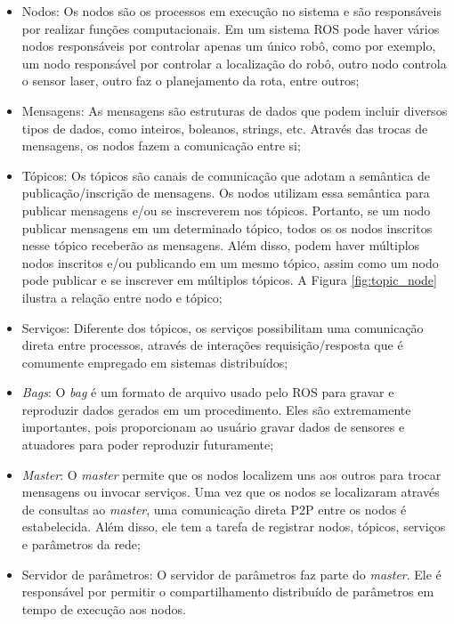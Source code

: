 \begin{itemize}
    \addtolength{\itemindent}{2em}
    \setlength\itemsep{1em}
    
    \item Nodos: Os nodos são os processos em execução no sistema e são responsáveis por realizar funções computacionais.  Em um sistema ROS pode haver vários nodos responsáveis por controlar apenas um único robô, como por exemplo, um nodo responsável por controlar a localização do robô, outro nodo controla o sensor laser, outro faz o planejamento da rota, entre outros;
    
    \item Mensagens: As mensagens são estruturas de dados que podem incluir diversos tipos de dados, como inteiros, boleanos, strings, etc. Através das trocas de mensagens, os nodos fazem a comunicação entre si;
    
    \item Tópicos: Os tópicos são canais de comunicação que adotam a semântica de publicação/inscrição de mensagens. Os nodos utilizam essa semântica para publicar mensagens e/ou se inscreverem nos tópicos. Portanto, se um nodo publicar mensagens em um determinado tópico, todos os os nodos inscritos nesse tópico receberão as mensagens. Além disso, podem haver múltiplos nodos inscritos e/ou publicando em um mesmo tópico, assim como um nodo pode publicar e se inscrever em múltiplos tópicos. A Figura \ref{fig:topic_node} ilustra a relação entre nodo e tópico;
    
    \item Serviços: Diferente dos tópicos, os serviços possibilitam uma comunicação direta entre processos, através de interações requisição/resposta que é comumente empregado em sistemas distribuídos;
    
    \item \textit{Bags}: O \textit{bag} é um formato de arquivo usado pelo ROS para gravar e reproduzir dados gerados em um procedimento. Eles são extremamente importantes, pois proporcionam ao usuário gravar dados de sensores e atuadores para poder reproduzir futuramente;
    
    \item \textit{Master}: O \textit{master} permite que os nodos localizem uns aos outros para trocar mensagens ou invocar serviços. Uma vez que os nodos se localizaram através de consultas ao \textit{master}, uma comunicação direta P2P entre os nodos é estabelecida. Além disso, ele tem a tarefa de registrar nodos, tópicos, serviços e parâmetros da rede;
    
    \item Servidor de parâmetros: O servidor de parâmetros faz parte do \textit{master}. Ele é responsável por permitir o compartilhamento distribuído de parâmetros em tempo de execução aos nodos.
\end{itemize}
\hspace{1em}

